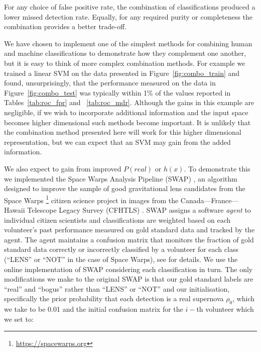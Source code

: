 \documentclass[a4paper,fleqn,usenatbib]{mnras}
\begin{document}
For any choice of false positive rate, the combination of classifications produced a lower missed detection rate. Equally, for any required purity or completeness the combination provides a better trade-off. 

We have chosen to implement one of the simplest methods for combining human and machine classifications to demonstrate how they complement one another, but it is easy to think of more complex combination methods. For example we trained a linear SVM on the data presented in Figure~\ref{fig:combo_train} and found, unsurprisingly, that the performance measured on the data in Figure~\ref{fig:combo_test} was typically within 1\% of the values reported in Tables~\ref{tab:roc_fpr} and ~\ref{tab:roc_mdr}.  Although the gains in this example are negligible, if we wish to incorporate additional information and the input space becomes higher dimensional such methods become important.  It is unlikely that the combination method presented here will work for this higher dimensional representation, but we can expect that an SVM may gain from the added information.

We also expect to gain from improved $P(real)$ or $h(x)$.  To demonstrate this we implemented the Space Warps Analysis Pipeline (SWAP) \citep{Marshall15}, an algorithm designed to improve the sample of good gravitational lens candidates from the Space Warps \footnote{\url{https://spacewarps.org}} citizen science project in images from the Canada--–France--–Hawaii Telescope Legacy Survey (CFHTLS) \citep{Gwyn12}.  SWAP assigns a software \emph{agent} to individual citizen scientists and classifications are weighted based on each volunteer's past performance measured on gold standard data and tracked by the agent.  The agent maintains a confusion matrix that monitors the fraction of gold standard data correctly or incorrectly classified by a volunteer for each class (``LENS'' or ``NOT'' in the case of Space Warps), see \citet{Marshall15} for details.   We use the online implementation of SWAP considering each classification in turn.  The only modifications we make to the original SWAP is that our gold standard labels are ``real'' and ``bogus'' rather than ``LENS'' or ``NOT'' and our initialisation, specifically the prior probability that each detection is a real supernova $\rho_0$, which we take to be 0.01 and the initial confusion matrix for the $i-$th volunteer which we set to:\\
\end{document}
